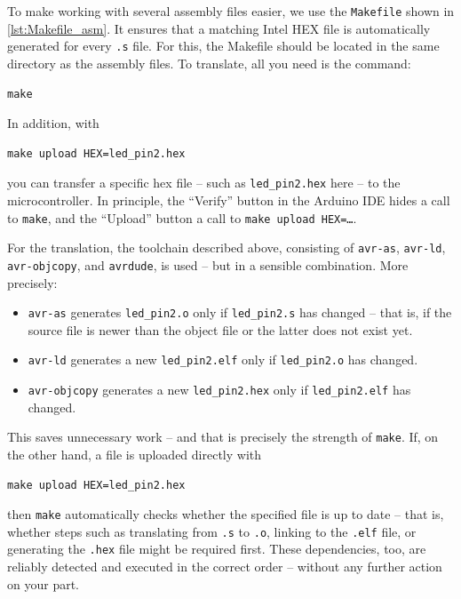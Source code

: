 \documentclass[a4paper,12pt]{article}
\begin{document}
\noindent
To make working with several assembly files easier, we use the
\texttt{Makefile} shown in \autoref{lst:Makefile_asm}. It ensures that a
matching Intel HEX file is automatically generated for every \texttt{.s}
file. For this, the Makefile should be located in the same directory as the
assembly files. To translate, all you need is the command:

\begin{lstlisting}
make
\end{lstlisting}
In addition, with
\begin{lstlisting}
make upload HEX=led_pin2.hex
\end{lstlisting}
you can transfer a specific hex file – such as \texttt{led\_pin2.hex} here –
to the microcontroller. In principle, the ``Verify'' button in the Arduino
IDE hides a call to \texttt{make}, and the ``Upload'' button a call to
\texttt{make upload HEX=\dots}.

\medskip
For the translation, the toolchain described above, consisting of
\texttt{avr-as}, \texttt{avr-ld}, \texttt{avr-objcopy}, and \texttt{avrdude},
is used – but in a sensible combination. More precisely:

\begin{itemize}
\item
    \texttt{avr-as} generates \texttt{led\_pin2.o} only if
    \texttt{led\_pin2.s} has changed – that is, if the source file is newer
    than the object file or the latter does not exist yet.
\item
    \texttt{avr-ld} generates a new \texttt{led\_pin2.elf} only if
    \texttt{led\_pin2.o} has changed.
\item
    \texttt{avr-objcopy} generates a new \texttt{led\_pin2.hex} only if
    \texttt{led\_pin2.elf} has changed.
\end{itemize}

\noindent
This saves unnecessary work – and that is precisely the strength of
\texttt{make}.
\medskip
If, on the other hand, a file is uploaded directly with
\begin{lstlisting}
make upload HEX=led_pin2.hex
\end{lstlisting}
\newpage
\noindent
then \texttt{make} automatically checks whether the specified file is up to
date – that is, whether steps such as translating from \texttt{.s} to
\texttt{.o}, linking to the \texttt{.elf} file, or generating the
\texttt{.hex} file might be required first. These dependencies, too, are
reliably detected and executed in the correct order – without any further
action on your part.
\end{document}
